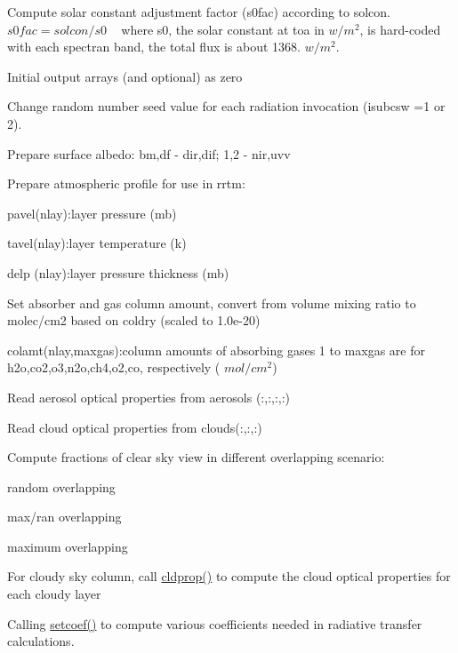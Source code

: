 \begin{DoxyEnumerate}
\item Compute solar constant adjustment factor (s0fac) according to solcon. ~\newline
 $ s0fac = solcon/s0 $ ~\newline
 where s0, the solar constant at toa in $ w/m^2 $, is hard-\/coded with each spectran band, the total flux is about 1368. $ w/m^2 $.
\item Initial output arrays (and optional) as zero
\item Change random number seed value for each radiation invocation (isubcsw =1 or 2).
\item Prepare surface albedo\+: bm,df -\/ dir,dif; 1,2 -\/ nir,uvv
\item Prepare atmospheric profile for use in rrtm\+:
\begin{DoxyItemize}
\item pavel(nlay)\+:layer pressure (mb)
\item tavel(nlay)\+:layer temperature (k)
\item delp (nlay)\+:layer pressure thickness (mb)
\end{DoxyItemize}
\item Set absorber and gas column amount, convert from volume mixing ratio to molec/cm2 based on coldry (scaled to 1.\+0e-\/20)
\begin{DoxyItemize}
\item colamt(nlay,maxgas)\+:column amounts of absorbing gases 1 to maxgas are for h2o,co2,o3,n2o,ch4,o2,co, respectively ( $ mol/cm^2 $)
\end{DoxyItemize}
\item Read aerosol optical properties from aerosols (\+:,\+:,\+:,\+:)
\item Read cloud optical properties from clouds(\+:,\+:,\+:)
\item Compute fractions of clear sky view in different overlapping scenario\+:
\begin{DoxyItemize}
\item random overlapping
\item max/ran overlapping
\item maximum overlapping
\end{DoxyItemize}
\item For cloudy sky column, call \hyperlink{namespacemodule__radsw__main_ae9779a4f9bc2ddc9d856c844639c9bd3}{cldprop()} to compute the cloud optical properties for each cloudy layer
\item Calling \hyperlink{namespacemodule__radsw__main_ab24dd3a4fae5749bf7ce09eebe6deb30}{setcoef()} to compute various coefficients needed in radiative transfer calculations.

\end{DoxyEnumerate}
